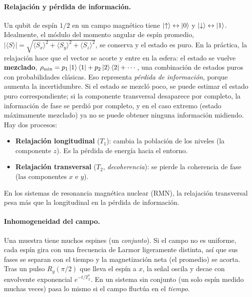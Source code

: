 \paragraph{Relajación y pérdida de información.} Un qubit de espín $1/2$ en
un campo magnético tiene $\left|\uparrow\right\rangle\leftrightarrow\left|0\right\rangle$ y
$\left|\downarrow\right\rangle\leftrightarrow\left|1\right\rangle$. Idealmente, el módulo del momento
angular de espín promedio, $|\langle S\rangle|=\sqrt{\langle S_x\rangle^2+\langle
S_y\rangle^2+\langle S_z\rangle^2}$, se conserva y el estado es puro. En la
práctica, la relajación hace que el vector se acorte y entre en la esfera:
el estado se vuelve \textbf{mezclado},
$\rho_{\mathrm{mix}}=p_1\left|1\right\rangle\left\langle1\right|+p_2\left|2\right\rangle\left\langle2\right|+\cdots$, una combinación de
estados puros con probabilidades clásicas. Eso representa \emph{pérdida de
información}, porque aumenta la incertidumbre. Si el estado se mezcló poco,
se puede estimar el estado puro correspondiente; si la componente transversal
desaparece por completo, la información de fase se perdió por completo, y en el
caso extremo (estado máximamente mezclado) ya no se puede obtener ninguna
información midiendo. Hay dos procesos:
\begin{itemize}
  \item \textbf{Relajación longitudinal} ($T_1$): cambia la población de los
    niveles (la componente $z$). Es la pérdida de energía hacia el entorno.
  \item \textbf{Relajación transversal} ($T_2$, \emph{decoherencia}): se pierde la
    coherencia de fase (las componentes $x$ e $y$).
\end{itemize}
En los sistemas de resonancia magnética nuclear (RMN), la relajación transversal
pesa más que la longitudinal en la pérdida de información.

\paragraph{Inhomogeneidad del campo.} Una muestra tiene muchos espines (un
\emph{conjunto}). Si el campo no es uniforme, cada espín gira con una
frecuencia de Larmor ligeramente distinta, así que sus fases se separan con el
tiempo y la magnetización neta (el promedio) se acorta. Tras un pulso
$R_y(\pi/2)$ que lleva el espín a $x$, la señal oscila y decae con envolvente
exponencial $e^{-t/T_2^{*}}$. En un sistema sin conjunto (un solo espín medido
muchas veces) pasa lo mismo si el campo fluctúa en el \emph{tiempo}.

